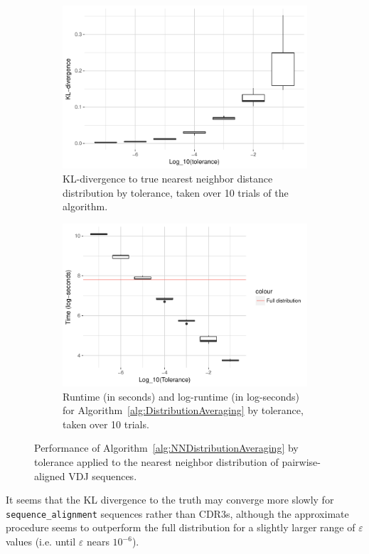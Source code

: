 \documentclass{article}
\begin{document}
\begin{figure}
\begin{subfigure}[b]{.49\textwidth}
        \includegraphics[width=\linewidth]{Figures/NearestNeighbor/Sequence/div_by_tol.pdf}
    	\caption{KL-divergence to true nearest neighbor distance distribution by tolerance, taken over 10 trials of the algorithm.}
    	\label{fig:NNDivergencesSequence}
	\end{subfigure}
    \begin{subfigure}[b]{.49\textwidth}
    	\includegraphics[width=0.9\linewidth]{Figures/NearestNeighbor/Sequence/log_time_by_tol.pdf}
    	\caption{Runtime (in seconds) and log-runtime (in log-seconds) for Algorithm~\ref{alg:DistributionAveraging} by tolerance, taken over 10 trials.}
    	\label{fig:NNTimesSequence}
    \end{subfigure}
    \caption{Performance of Algorithm~\ref{alg:NNDistributionAveraging} by tolerance applied to the nearest neighbor distribution of pairwise-aligned VDJ sequences.}
\end{figure}
It seems that the KL divergence to the truth may converge more slowly for \texttt{sequence\_alignment} sequences rather than CDR3s, although the approximate procedure seems to outperform the full distribution for a slightly larger range of $\varepsilon$ values (i.e. until $\varepsilon$ nears $10^{-6}$).
\end{document}
